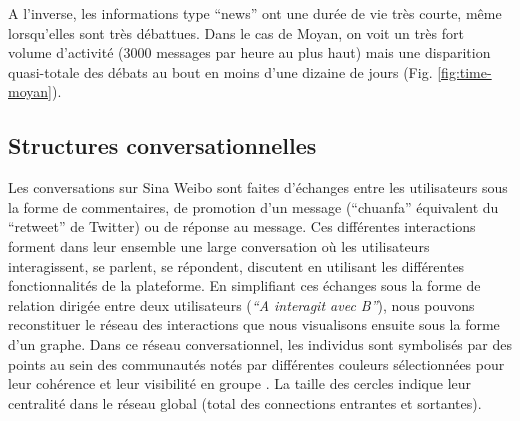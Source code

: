 A l{\textquoteright}inverse, les informations type {\textquotedblleft}news{\textquotedblright} ont une dur\'ee de vie tr\`es courte, m\^eme lorsqu{\textquoteright}elles sont tr\`es d\'ebattues. Dans le cas de Moyan, on voit un tr\`es fort volume d{\textquoteright}activit\'e (3000 messages par heure au plus haut) mais une disparition quasi-totale des d\'ebats au bout en moins d{\textquoteright}une dizaine de jours (Fig. \ref{fig:time-moyan}).

\subsection[Structures conversationnelles]{Structures conversationnelles}

Les conversations sur Sina Weibo sont faites d{\textquoteright}\'echanges entre les utilisateurs sous la forme de commentaires, de promotion d{\textquoteright}un message ({\textquotedblleft}chuanfa{\textquotedblright} \'equivalent du {\textquotedblleft}retweet{\textquotedblright} de Twitter) ou de r\'eponse au message. Ces diff\'erentes interactions forment dans leur ensemble une large conversation o\`u les utilisateurs interagissent, se parlent, se r\'epondent, discutent en utilisant les diff\'erentes fonctionnalit\'es de la plateforme. En simplifiant ces \'echanges sous la forme de relation dirig\'ee entre deux utilisateurs (\textit{{\textquotedblleft}A interagit avec B{\textquotedblright}}), nous pouvons reconstituer le r\'eseau des interactions que nous visualisons ensuite sous la forme d{\textquoteright}un graphe. Dans ce réseau conversationnel, les individus sont symbolisés par des points au sein des communautés notés par différentes couleurs sélectionnées pour leur cohérence et leur visibilité en groupe \citep{Lin2013}. La taille des cercles indique leur centralité dans le réseau global (total des connections entrantes et sortantes). 



